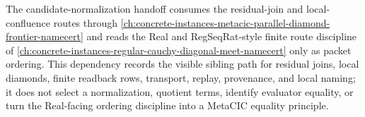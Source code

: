 The candidate-normalization handoff consumes the residual-join and local-confluence routes through \autoref{ch:concrete-instances-metacic-parallel-diamond-frontier-namecert} and reads the Real and RegSeqRat-style finite route discipline of \autoref{ch:concrete-instances-regular-cauchy-diagonal-meet-namecert} only as packet ordering. This dependency records the visible sibling path for residual joins, local diamonds, finite readback rows, transport, replay, provenance, and local naming; it does not select a normalization, quotient terms, identify evaluator equality, or turn the Real-facing ordering discipline into a MetaCIC equality principle.
